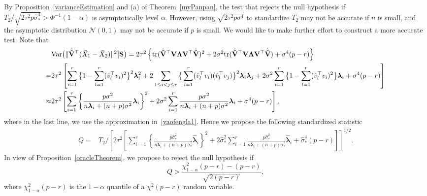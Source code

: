 \documentclass[times,sort&compress,3p]{elsarticle}
\newcommand{\mytr}{ {\rm tr} }
\newcommand{\myVar}{ {\rm Var} }
\newcommand{\bfsym}[1]{\ensuremath{\boldsymbol{#1}}}
\def\blambda {\bfsym {\lambda}}        \def\bLambda {\bfsym {\Lambda}}
\theoremstyle{plain}
\theoremstyle{definition}
\theoremstyle{remark}
\begin{document}
By Proposition~\ref{varianceEstimation} and (a) of Theorem~\ref{myPanpan}, the test that rejects the null hypothesis if
$
T_2/\sqrt{2\tau^2 p\hat{\sigma}^4_*}>\Phi^{-1}(1-\alpha)
$
is asymptotically level $\alpha$.
However, using $\sqrt{2\tau^2 p\sigma^4}$ to standardize $T_2$ may not be accurate if $n$ is small, and the asymptotic distribution $\mathcal{N}(0,1)$ may not be accurate if $p$ is small.
We would like to make further effort to construct a more accurate test.
Note that
\begin{align*}
    &\myVar\big(
\|\hat{\tilde{\BV}}^\top  (\bar{X}_1-\bar{X}_2)\|^2
\big| \BS
\big)
    =2\tau^2\left\{
\mytr(\hat{\tilde{\BV}}^\top  \BV \bLambda \BV^\top \hat{\tilde{\BV}})^2
+
2\sigma^2\mytr(\hat{\tilde{\BV}}^\top  \BV \bLambda \BV^\top \hat{\tilde{\BV}})
+\sigma^4 (p-r)
\right\}
\\
    =&
    2\tau^2\left[
        \sum_{i=1}^r \big\{1-\sum_{l=1}^r (\hat{v}_l^\top  v_i)^2\big\}^2 \blambda_i^2
        +2\sum_{1\leq i<j \leq r}\big\{\sum_{l=1}^r (\hat{v}_l^\top  v_i)(\hat{v}_l^\top  v_j )\big\}^2\blambda_i\blambda_j
    +
    2\sigma^2\sum_{i=1}^r \big\{ 1-\sum_{l=1}^r (\hat{v}_l^\top  v_i)^2\big\} \blambda_i
    +\sigma^4 (p-r)
\right]
    \\
    \approx&
    2\tau^2\left[
        \sum_{i=1}^r \left\{\frac{p\sigma^2}{n\blambda_i+(n+p)\sigma^2}\blambda_i\right\}^2
    +
    2\sigma^2\sum_{i=1}^r \frac{p\sigma^2}{n\blambda_i+(n+p)\sigma^2}\blambda_i
    +\sigma^4 (p-r)
\right],
\end{align*}
where in the last line, we use the approximation in~\eqref{yaofengla1}.
Hence we propose the following standardized statistic
$$
    \begin{aligned}
        Q=&T_2/
   \left[ 
        2\tau^2\left[
            \sum_{i=1}^r \left\{\frac{p\hat{\sigma}_*^2}{n\hat{\blambda}_i+(n+p)\hat{\sigma}_*^2}\hat{\blambda}_i\right\}^2
    +
        2\hat{\sigma}_*^2\sum_{i=1}^r \frac{p\hat{\sigma}_*^2}{n\hat{\blambda}_i+(n+p)\hat{\sigma}_*^2}\hat{\blambda}_i
        +\hat{\sigma}_*^4 (p-r)
\right]\right]^{1/2}.
    \end{aligned}
$$
In view of Proposition~\ref{oracleTheorem}, we propose to reject the null hypothesis if
$$
        Q>\frac{\chi^2_{1-\alpha}(p-r)-(p-r)}{\sqrt{2(p-r)}},
$$
where $\chi^2_{1-\alpha} (p-r)$ is the $1-\alpha$ quantile of a $\chi^2(p-r)$ random variable.
\end{document}
